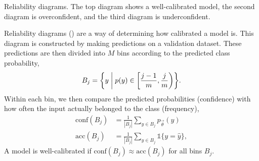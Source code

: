 \begin{marginfigure}
    \vfill

    \caption{Reliability diagrams. The top diagram shows a well-calibrated model,
        the second diagram is overconfident, and the third diagram is
        underconfident.}
    \label{fig:reliability-diagrams}
\end{marginfigure}

Reliability diagrams () are a way of determining
how calibrated a model is. This diagram is constructed by making predictions on
a validation dataset. These predictions are then divided into $M$ bins
according to the predicted class probability, \[
    B_j = \lft\{ y \; \middle| \; p(y) \in \lft[ \frac{j-1}{m}, \frac{j}{m} \rgt) \rgt\}.
\]
Within each bin, we then compare the predicted probabilities (confidence) with
how often the input actually belonged to the class (frequency),
\begin{align*}
    \mathrm{conf}(B_j) & = \frac{1}{|B_j|} \sum_{y \in B_j} p_{\vec{\theta}}(y)          \\
    \mathrm{acc}(B_j)  & = \frac{1}{|B_j|} \sum_{y \in B_j} \mathbb{1}\{ y = \hat{y} \},
\end{align*}
A model is well-calibrated if $\mathrm{conf}(B_j) \approx \mathrm{acc}(B_j)$
for all bins $B_j$.
